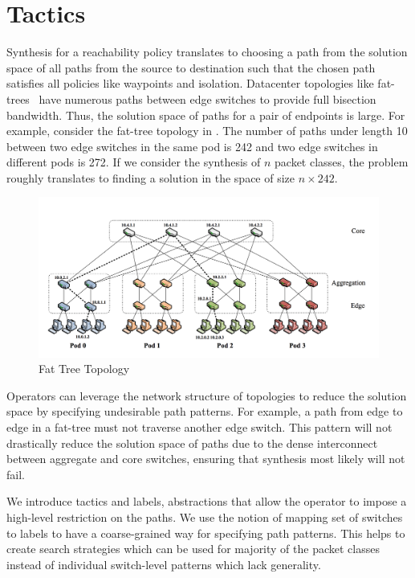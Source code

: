 \section{Tactics} \label{sec:tactic}
Synthesis for a reachability policy translates to choosing a path from the 
solution space of all paths from the source to destination such that the 
chosen path satisfies all policies like waypoints and isolation. Datacenter 
topologies like fat-trees~\cite{fattree} have numerous paths between 
edge switches to provide full bisection bandwidth. 
Thus, the solution space of paths for a pair of endpoints is large. 
For example, consider the fat-tree topology in . 
The number of paths under length 10 between two edge  switches 
in the same pod is 242 and two edge switches in different pods is 272. 
If we consider the synthesis of $n$ packet classes, the problem 
roughly translates to finding a solution in the space of size $n \times 242$.
\begin{figure}[h]
	\includegraphics[width=\columnwidth]{fattree.png}
	\caption{Fat Tree Topology}
	\label{fig:fattree}
\end{figure}
Operators can leverage the network structure of topologies
 to reduce the solution space by specifying undesirable path patterns. 
 For example, a path from edge to edge in a fat-tree must not traverse another edge switch.
 This pattern will not drastically reduce the solution space of paths 
 due to the dense interconnect between aggregate and core switches,
 ensuring that synthesis most likely will not fail. 

We introduce tactics and labels, abstractions that allow the 
operator to impose a high-level restriction on the paths. 
We use the notion of mapping set of switches to labels to 
have a coarse-grained way for specifying path patterns. This helps
to create search strategies which can be used for majority 
of the packet classes instead of individual switch-level patterns which
lack generality.

